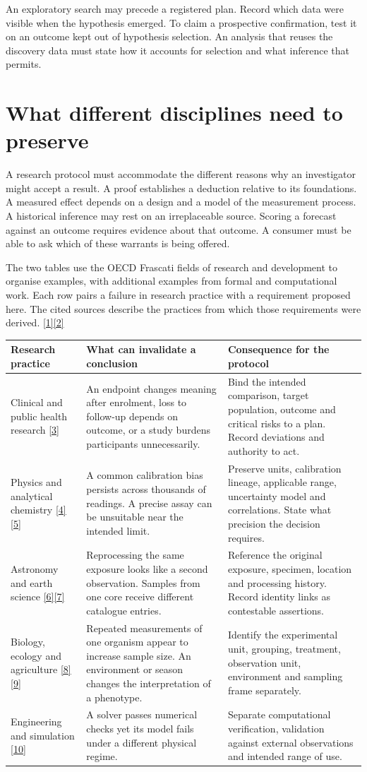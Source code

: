 \documentclass[11pt,a4paper]{article}
\newcommand{\partpage}[1]{\clearpage\section{#1}}
\newcommand{\src}[1]{\hyperlink{ref#1}{[#1]}}
\begin{document}
An exploratory search may precede a registered plan. Record which data were visible when the hypothesis emerged. To claim a prospective confirmation, test it on an outcome kept out of hypothesis selection. An analysis that reuses the discovery data must state how it accounts for selection and what inference that permits.

\partpage{What different disciplines need to preserve}
A research protocol must accommodate the different reasons why an investigator might accept a result. A proof establishes a deduction relative to its foundations. A measured effect depends on a design and a model of the measurement process. A historical inference may rest on an irreplaceable source. Scoring a forecast against an outcome requires evidence about that outcome. A consumer must be able to ask which of these warrants is being offered.

The two tables use the OECD Frascati fields of research and development to organise examples, with additional examples from formal and computational work. Each row pairs a failure in research practice with a requirement proposed here. The cited sources describe the practices from which those requirements were derived. \src{1}\src{2}

\small
\begin{tabularx}{\linewidth}{@{}L{.225\linewidth}YY@{}}
\toprule
\textbf{Research practice} & \textbf{What can invalidate a conclusion} & \textbf{Consequence for the protocol} \\ \midrule
Clinical and public health research \src{3} & An endpoint changes meaning after enrolment, loss to follow-up depends on outcome, or a study burdens participants unnecessarily. & Bind the intended comparison, target population, outcome and critical risks to a plan. Record deviations and authority to act. \\
Physics and analytical chemistry \src{4}\src{5} & A common calibration bias persists across thousands of readings. A precise assay can be unsuitable near the intended limit. & Preserve units, calibration lineage, applicable range, uncertainty model and correlations. State what precision the decision requires. \\
Astronomy and earth science \src{6}\src{7} & Reprocessing the same exposure looks like a second observation. Samples from one core receive different catalogue entries. & Reference the original exposure, specimen, location and processing history. Record identity links as contestable assertions. \\
Biology, ecology and agriculture \src{8}\src{9} & Repeated measurements of one organism appear to increase sample size. An environment or season changes the interpretation of a phenotype. & Identify the experimental unit, grouping, treatment, observation unit, environment and sampling frame separately. \\
Engineering and simulation \src{10} & A solver passes numerical checks yet its model fails under a different physical regime. & Separate computational verification, validation against external observations and intended range of use. \\
\bottomrule
\end{tabularx}
\normalsize
\end{document}
